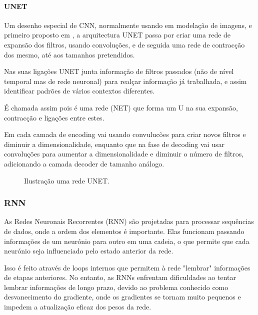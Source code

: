\paragraph{UNET\label{se:unet_sec}}
\text{ }  \par
Um desenho especial de \gls{CNN}, normalmente usando em modelação de imagens, e primeiro proposto em \cite{Shelhamer2014}, a arquitectura UNET passa por criar uma rede de expansão dos filtros, usando convoluções, e de seguida uma rede de contracção dos mesmo, até aos tamanhos pretendidos.\par
Nas suas ligações UNET junta informação de filtros passados (não de nível temporal mas de rede neuronal) para realçar informação já trabalhada, e assim identificar padrões de vários contextos diferentes.\par
É chamada assim pois é uma rede (NET) que forma um U na sua expansão, contracção e ligações entre estes.\par
Em cada camada de encoding vai usando convulucões para criar novos filtros e diminuir a dimensionalidade, enquanto que na fase de decoding vai usar convoluções para aumentar a dimensionalidade e diminuir o número de filtros, adicionando a camada decoder de tamanho análogo.\par

\begin{figure}[H]
	\centering
	\resizebox{\linewidth}{!}{}
	\caption{Ilustração uma rede UNET.}
	\label{fig:unet_graph}
\end{figure}


\subsubsection{RNN\label{se:rnn_sec}}

As Redes Neuronais Recorrentes (RNN) são projetadas para processar sequências de dados, onde a ordem dos elementos é importante. Elas funcionam passando informações de um neurónio para outro em uma cadeia, o que permite que cada neurónio seja influenciado pelo estado anterior da rede.\par
Isso é feito através de loops internos que permitem à rede "lembrar" informações de etapas anteriores. No entanto, as RNNs enfrentam dificuldades ao tentar lembrar informações de longo prazo, devido ao problema conhecido como desvanecimento do gradiente, onde os gradientes se tornam muito pequenos e impedem a atualização eficaz dos pesos da rede.\par

